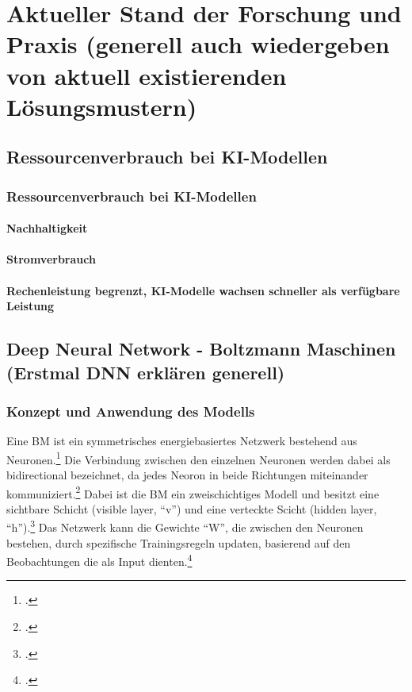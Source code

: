 \chapter{Aktueller Stand der Forschung und Praxis (generell auch wiedergeben von aktuell existierenden Lösungsmustern)}

\section{Ressourcenverbrauch bei KI-Modellen}
\subsection{Ressourcenverbrauch bei KI-Modellen}
\subsubsection{Nachhaltigkeit}
\subsubsection{Stromverbrauch}
\subsubsection{Rechenleistung begrenzt, KI-Modelle wachsen schneller als verfügbare Leistung}

\section{Deep Neural Network - Boltzmann Maschinen (Erstmal DNN erklären generell)}
\subsection{Konzept und Anwendung des Modells }

Eine \ac{BM} ist ein symmetrisches energiebasiertes Netzwerk bestehend aus Neuronen.\Footcite[Vgl.][260]{amariInformationGeometryBoltzmann1992}
Die Verbindung zwischen den einzelnen Neuronen werden dabei als bidirectional bezeichnet, da jedes Neoron in beide Richtungen miteinander kommuniziert.\footcite[Vgl.][149]{ackleyLearningAlgorithmBoltzmann1985}
Dabei ist die \ac{BM} ein zweischichtiges Modell und besitzt eine sichtbare Schicht (visible layer, ``v'') und eine verteckte Scicht (hidden layer, ``h'').\footcite[Vgl.][448]{salakhutdinovDeepBoltzmannMachines2009}
Das Netzwerk kann die Gewichte ``W'', die zwischen den Neuronen bestehen, durch spezifische Trainingsregeln updaten, basierend auf den Beobachtungen die als Input dienten.\footcite[Vgl.][1-2]{barraEquivalenceHopfieldNetworks2012}

